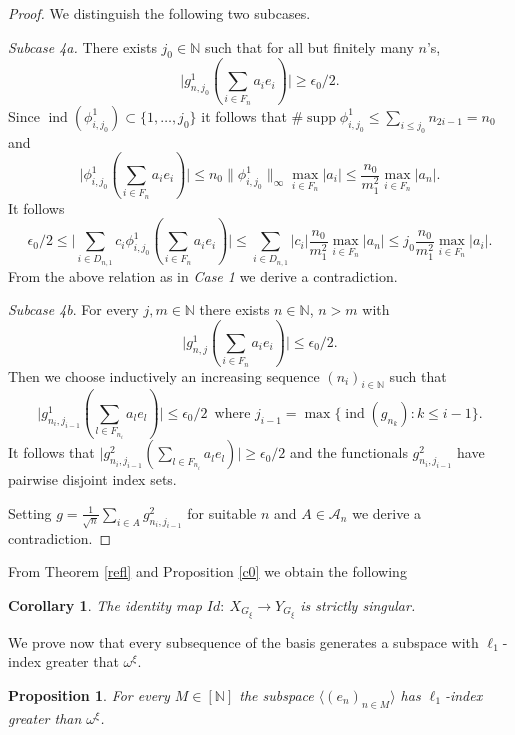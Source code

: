 \documentclass[a4paper]{amsart}
\theoremstyle{plain}
\newtheorem{proposition}[theorem]{Proposition}
\newtheorem{corollary}[theorem]{Corollary}
\newcommand{\N}{\mathbb{N}}
\newcommand{\e}{\epsilon}
\newcommand{\norm}[1][\cdot]{\lVert #1\rVert}
\DeclareMathOperator{\supp}{supp}
\DeclareMathOperator{\ind}{ind}
\begin{document}
\begin{proof}
We distinguish the following two subcases.

\textit{Subcase 4a.} There exists $j_0\in\N$ such that for all but finitely many $n$'s,
$$
\vert g_{n,j_0}^{1}(\sum_{i\in F_n}a_{i}e_{i})\vert\geq \e_{0}/2.
$$
Since  $\ind(\phi_{i,j_0}^{1})\subset\{1,\dots,j_0\}$ it follows that  $\#\supp \phi_{i,j_0}^{1}\leq\sum_{i\leq j_0}n_{2i-1}=n_{0}$ and
$$
\vert \phi_{i,j_0}^{1}(\sum_{i\in F_{n}}a_{i}e_{i})\vert\leq n_0\norm[\phi_{i,j_0}^{1}]_{\infty}\max_{i\in F_{n}}\vert a_i\vert
\leq \frac{n_0}{m_{1}^{2}}\max_{i\in F_{n}}\vert a_{n}\vert.
$$
It follows
$$
\e_0/2\leq \vert \sum_{i\in D_{n,1}}c_{i}\phi_{i,j_0}^{1}(\sum_{i\in
F_{n}}a_{i}e_{i})\vert\leq \sum_{i\in D_{n,1}}\vert
c_i\vert\frac{n_0}{m_{1}^{2}}\max_{i\in F_{n}}\vert a_{n}\vert\leq
j_{0}\frac{n_0}{m_{1}^{2}}\max_{i\in F_{n}}\vert a_{i}\vert.
$$
From the above relation as in \textit{Case 1} we derive a contradiction.


\textit{Subcase 4b}. For every $j,m\in\N$ there exists $n\in\N$,
$n>m$ with
$$
\vert g_{n,j}^{1}(\sum_{i\in F_{n}}a_{i}e_{i})\vert\leq \e_0/2.
$$
Then  we choose inductively an increasing sequence $(n_{i})_{i\in\N}$ such that
$$
\vert g_{n_i, j_{i-1}}^{1}(\sum_{l\in F_{n_i}}a_{l}e_{l})\vert\leq\e_{0}/2
\,\,\,\mbox{where $j_{i-1}=\max\{\ind(g_{n_k}):k\leq i-1\}$.}
$$
It follows that
$
\vert g_{n_i, j_{i-1}}^{2}(\sum_{l\in F_{n_i}}a_{l}e_{l})\vert\geq\e_{0}/2
$
and the functionals $g^{2}_{n_i,j_{i-1}}$ have pairwise disjoint index sets.

Setting $g=\frac{1}{\sqrt{n}}
\sum_{i\in A}g_{n_i,j_{i-1}}^{2}$ for suitable $n$ and $A\in\mathcal{A}_{n}$ we derive a contradiction.
\end{proof}
From Theorem \ref{refl} and  Proposition \ref{c0} we obtain the following
\begin{corollary}\label{iss}
The identity map $Id:\ X_{G_{\xi}}\to Y_{G_{\xi}}$ is strictly singular.
\end{corollary}
We prove now that every subsequence of the basis generates a subspace with 
$\ell_{1}$-index greater that $\omega^{\xi}$.
\begin{proposition}
For every $M \in [\N]$ the subspace  $\langle (e_{n})_{n\in M}\rangle$ has   $\ell_{1}$-index greater than $\omega^{\xi}$.
\end{proposition}
\end{document}
